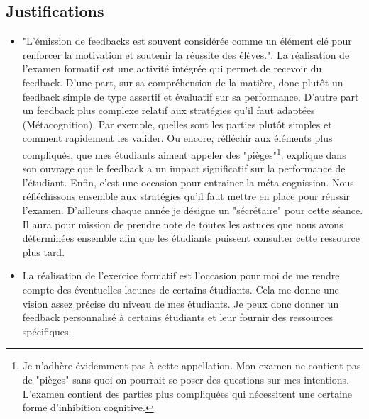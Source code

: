 \subsection{Justifications}
\label{evaluation_des_apprentissages_justifications}
\begin{itemize}
    \item "L’émission de feedbacks est souvent considérée comme un élément clé pour renforcer la motivation et soutenir la réussite des élèves."\cite{georges2011feedbacks}. La réalisation de l'examen formatif est une activité intégrée qui permet de recevoir du feedback. D'une part, sur sa compréhension de la matière, donc plutôt un feedback simple de type assertif et évaluatif \cite{georges2011feedbacks} sur sa performance. D'autre part un feedback plus complexe relatif aux stratégies qu'il faut adaptées (Métacognition). Par exemple, quelles sont les parties plutôt simples et comment rapidement les valider. Ou encore, réfléchir aux éléments plus compliqués, que mes étudiants aiment appeler des "pièges"\footnote{Je n'adhère évidemment pas à cette appellation. Mon examen ne contient pas de "pièges" sans quoi on pourrait se poser des questions sur mes intentions. L'examen contient des parties plus compliquées qui nécessitent une certaine forme d'inhibition cognitive.}. \citep{hattie2008visible} explique dans son ouvrage que le feedback a un impact significatif sur la performance de l'étudiant. Enfin, c'est une occasion pour entrainer la méta-cognission\cite{leclercq2008modele}. Nous réfléchissons ensemble aux stratégies qu'il faut mettre en place pour réussir l'examen. D'ailleurs chaque année je désigne un "sécrétaire" pour cette séance. Il aura pour mission de prendre note de toutes les astuces que nous avons déterminées ensemble afin que les étudiants puissent consulter cette ressource plus tard.
    \item La réalisation de l'exercice formatif est l'occasion pour moi de me rendre compte des éventuelles lacunes de certains étudiants. Cela me donne une vision assez précise du niveau de mes étudiants. Je peux donc donner un feedback personnalisé à certains étudiants et leur fournir des ressources spécifiques.
\end{itemize}

